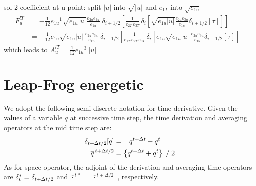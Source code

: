 \documentclass[NEMO_book]{subfiles}
\begin{document}
sol 2 coefficient at u-point: split $|u|$ into $\sqrt{|u|}$ and $e_{1T}$ into $\sqrt{e_{1u}}$
\begin{equation} \label{Eq_tra_adv_ubs2}
\begin{split}
F_u^{lT}
&= - \frac{1}{12} {e_{1u}}^1 \sqrt{e_{1u}|u|} \frac{e_{2u} e_{3u}}{e_{1u}}\;\delta_{i+1/2}\left[ \frac{1}{e_{2T}\,e_{3T}}\,\delta _i \left[ \sqrt{e_{1u}|u|} \frac{e_{2u} e_{3u} }{e_{1u} } \delta _{i+1/2}[\tau] \right] \right] \\
&= - \frac{1}{12} e_{1u} \sqrt{e_{1u}|u|\,} \frac{e_{2u} e_{3u}}{e_{1u}}\;\delta_{i+1/2}\left[ \frac{1}{e_{1T}\,e_{2T}\,e_{3T}}\,\delta _i \left[ e_{1u} \sqrt{e_{1u}|u|\,} \frac{e_{2u} e_{3u} }{e_{1u}} \delta _{i+1/2}[\tau] \right] \right]
\end{split}
\end{equation}
which leads to ${A_u^{lT}} = \frac{1}{12} {e_{1u}}^3\ |u|$


\section{Leap-Frog energetic }
\label{LF}

We adopt the following semi-discrete notation for time derivative. Given the values of a variable $q$ at successive time step, the time derivation and averaging operators at the mid time step are:
\begin{subequations} \label{dt_mt}
\begin{align}
 \delta _{t+\Delta t/2} [q]     &=  \  \ \,   q^{t+\Delta t}  - q^{t}		\\
 \overline q^{\,t+\Delta t/2} &= \left\{ q^{t+\Delta t} + q^{t} \right\} \; / \; 2
\end{align}
\end{subequations}
As for space operator, the adjoint of the derivation and averaging time operators are 
$\delta_t^*=\delta_{t+\Delta t/2}$ and $\overline{\cdot}^{\,t\,*}= \overline{\cdot}^{\,t+\Delta/2}$
, respectively. 
\end{document}
